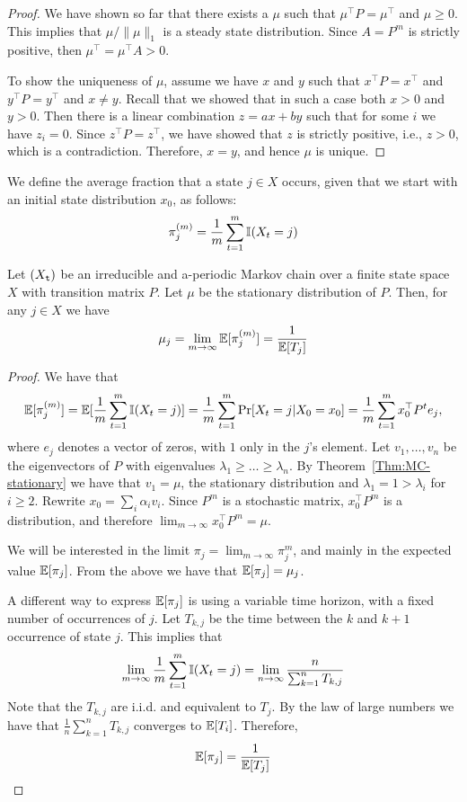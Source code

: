 \begin{proof}
We have shown so far that there exists a $\mu$ such that $\mu^\top
P=\mu^\top$ and $\mu\geq 0$. This implies that $\mu/\|\mu\|_1$ is a steady state distribution.
Since $A=P^m$ is strictly positive,
then $\mu^\top=\mu^\top A >0$.

To show the uniqueness of $\mu$, assume we have $x$ and $y$ such
that $x^\top P=x^\top$ and $y^\top P=y^\top$ and $x\neq y$. Recall
that we showed that in such a case both $x>0$ and $y>0$. Then there
is a linear combination $z=ax+by$ such that for some $i$ we have
$z_i=0$. Since $z^\top P=z^\top$, we have showed that $z$ is
strictly positive, i.e., $z>0$, which is a contradiction. Therefore,
$x=y$, and hence $\mu$ is unique.
\end{proof}

We define the average fraction that a state $j\in X$ occurs, given
that we start with an initial state distribution $x_0$,  as follows:
\[
\pi^{(m)}_j=\frac{1}{m}\sum_{t=1}^m \mathbb{I} (X_t=j)
\]

\begin{theorem}
Let $({X_{\tt t}})$ be an irreducible and  a-periodic Markov chain
over a finite state space $X$ with transition matrix $P$. Let $\mu$
be the stationary distribution of $P$. Then, for any $j\in X$ we
have
\[
\mu_j=\lim_{m\rightarrow\infty} \mathbb{E}[\pi^{(m)}_j] =\frac{1}{\mathbb{E}[T_j]}
\]
\end{theorem}

\begin{proof}
We have that
\[
\mathbb{E}[\pi^{(m)}_j]=\mathbb{E}[\frac{1}{m}\sum_{t=1}^m \mathbb{I}
(X_t=j)]=\frac{1}{m}\sum_{t=1}^m \Pr
[X_t=j|X_0=x_0]=\frac{1}{m}\sum_{t=1}^m x_0^\top P^t e_j,
\]
where $e_j$ denotes a vector of zeros, with $1$ only in the $j$'s element. Let $v_1, \ldots , v_n$ be the eigenvectors of $P$ with eigenvalues
$\lambda_1 \geq  \ldots \geq  \lambda_n$. By
Theorem~\ref{Thm:MC-stationary} we have that $v_1=\mu$, the stationary
distribution and $\lambda_1=1>\lambda_i$ for $i\geq 2$. Rewrite
$x_0=\sum_i \alpha_i v_i$. Since $P^m$ is a stochastic matrix,
$x_0^\top P^m$ is a distribution, and therefore $\lim_{m\rightarrow
\infty} x_0^\top P^m=\mu$.

We will be interested in the limit $\pi_j=\lim_{m\rightarrow \infty}
\pi^{m}_j $, and mainly in the expected value $\mathbb{E}[\pi_j]$. From the
above we have that $\mathbb{E}[\pi_j]=\mu_j$.

A different way to express $\mathbb{E}[\pi_j]$ is using a variable time
horizon, with a fixed number of occurrences of $j$. Let $T_{k,j}$ be
the time between the $k$ and $k+1$ occurrence of state $j$. This
implies that
\[
\lim_{m\rightarrow\infty}\frac{1}{m}\sum_{t=1}^m \mathbb{I} (X_t=j) =
\lim_{n\rightarrow\infty} \frac{n}{\sum_{k=1}^n T_{k,j}}
\]
Note that the $T_{k,j}$ are i.i.d. and equivalent to $T_j$. By the
law of large numbers we have that $\frac{1}{n}\sum_{k=1}^n T_{k,j}$
converges to $\mathbb{E}[T_i]$. Therefore,
\[
\mathbb{E}[\pi_j]=\frac{1}{\mathbb{E}[T_j]}
\]
\end{proof}

